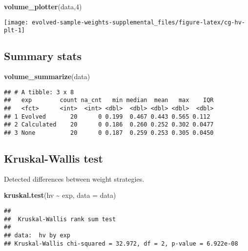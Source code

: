 \documentclass[
]{book}
\newenvironment{Shaded}{\begin{snugshade}}{\end{snugshade}}
\newcommand{\AttributeTok}[1]{\textcolor[rgb]{0.13,0.29,0.53}{#1}}
\newcommand{\DecValTok}[1]{\textcolor[rgb]{0.00,0.00,0.81}{#1}}
\newcommand{\FunctionTok}[1]{\textcolor[rgb]{0.13,0.29,0.53}{\textbf{#1}}}
\newcommand{\NormalTok}[1]{#1}
\newcommand{\SpecialCharTok}[1]{\textcolor[rgb]{0.81,0.36,0.00}{\textbf{#1}}}
\begin{document}
\begin{Shaded}
\begin{Highlighting}[]
\FunctionTok{volume\_plotter}\NormalTok{(data,}\DecValTok{4}\NormalTok{)}
\end{Highlighting}
\end{Shaded}

\texttt{[image: evolved-sample-weights-supplemental\_files/figure-latex/cg-hv-plt-1]}

\hypertarget{summary-stats-3}{%
\subsection{Summary stats}\label{summary-stats-3}}

\begin{Shaded}
\begin{Highlighting}[]
\FunctionTok{volume\_summarize}\NormalTok{(data)}
\end{Highlighting}
\end{Shaded}

\begin{verbatim}
## # A tibble: 3 x 8
##   exp        count na_cnt   min median  mean   max    IQR
##   <fct>      <int>  <int> <dbl>  <dbl> <dbl> <dbl>  <dbl>
## 1 Evolved       20      0 0.199  0.467 0.443 0.565 0.112 
## 2 Calculated    20      0 0.186  0.260 0.252 0.302 0.0477
## 3 None          20      0 0.187  0.259 0.253 0.305 0.0450
\end{verbatim}

\hypertarget{kruskal-wallis-test-3}{%
\subsection{Kruskal-Wallis test}\label{kruskal-wallis-test-3}}

Detected differences between weight strategies.

\begin{Shaded}
\begin{Highlighting}[]
\FunctionTok{kruskal.test}\NormalTok{(hv }\SpecialCharTok{\textasciitilde{}}\NormalTok{ exp, }\AttributeTok{data =}\NormalTok{ data)}
\end{Highlighting}
\end{Shaded}

\begin{verbatim}
## 
##  Kruskal-Wallis rank sum test
## 
## data:  hv by exp
## Kruskal-Wallis chi-squared = 32.972, df = 2, p-value = 6.922e-08
\end{verbatim}
\end{document}
